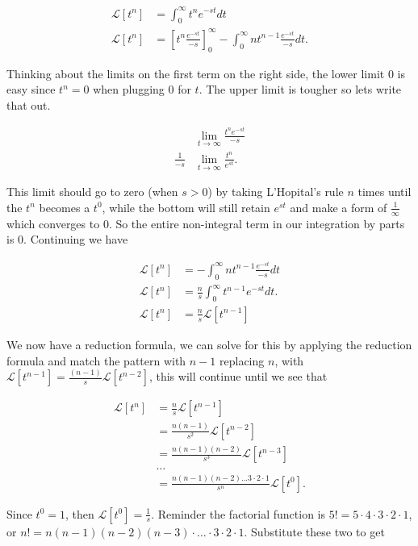 \documentclass[12pt]{article}
\newcommand{\lp}{\mathscr{L}}
\begin{document}
\begin{align*}
    \lp[t^n]&= \int_0^{\infty} t^n e^{-st} dt \\
    \lp[t^n]&= \left[t^n\frac{e^{-st}}{-s}\right]_0^{\infty}-\int_0^{\infty} nt^{n-1} \frac{e^{-st}}{-s} dt.
\end{align*}

Thinking about the limits on the first term on the right side, the lower limit $0$ is easy since $t^n=0$ when plugging $0$ for $t$. The upper limit is tougher so lets write that out. 

\begin{align*}
    & \lim_{t\to \infty} \frac{t^ne^{-st}}{-s} \\
    \frac{1}{-s}& \lim_{t\to \infty} \frac{t^n}{e^{st}}.
\end{align*}

This limit should go to zero (when $s>0$) by taking L'Hopital's rule $n$ times until the $t^n$ becomes a $t^0$, while the bottom will still retain $e^{st}$ and make a form of $\frac{1}{\infty}$ which converges to $0$. So the entire non-integral term in our integration by parts is $0$. Continuing we have

\begin{align*}
    \lp[t^n] &= -\int_0^{\infty} nt^{n-1} \frac{e^{-st}}{-s} dt \\
    \lp[t^n] &= \frac{n}{s}\int_0^{\infty} t^{n-1}e^{-st} dt. \\
    \lp[t^n] &= \frac{n}{s} \lp[t^{n-1}]
\end{align*}

We now have a reduction formula, we can solve for this by applying the reduction formula and match the pattern with $n-1$ replacing $n$, with $\lp[t^{n-1}]=\frac{(n-1)}{s} \lp[t^{n-2}]$, this will continue until we see that

\begin{align*}
    \lp[t^n] &= \frac{n}{s} \lp[t^{n-1}] \\
     &= \frac{n(n-1)}{s^2} \lp[t^{n-2}] \\
     &= \frac{n(n-1)(n-2)}{s^3} \lp[t^{n-3}] \\
     &\ldots \\
     &= \frac{n(n-1)(n-2)...3\cdot2\cdot1}{s^n} \lp[t^0].
\end{align*}

Since $t^0=1$, then $\lp[t^0]=\frac{1}{s}$. Reminder the factorial function is $5!=5\cdot4\cdot3\cdot2\cdot1$, or $n!=n(n-1)(n-2)(n-3)\cdot \ldots \cdot3\cdot2\cdot1$. Substitute these two to get
\end{document}
